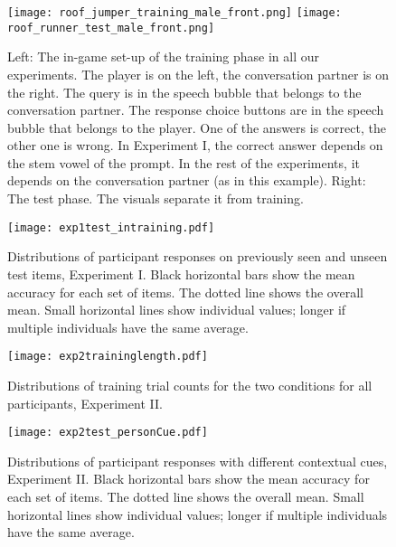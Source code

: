 \documentclass{frontiersSCNS} %
\begin{document}
\begin{figure}[ht]
\begin{center}
\texttt{[image: roof\_jumper\_training\_male\_front.png]}
\texttt{[image: roof\_runner\_test\_male\_front.png]}\\
\end{center}
\caption{ \large Left: The in-game set-up of the training phase in all our experiments. The player is on the left, the conversation partner is on the right. The query is in the speech bubble that belongs to the conversation partner. The response choice buttons are in the speech bubble that belongs to the player. One of the answers is correct, the other one is wrong. In Experiment I, the correct answer depends on the stem vowel of the prompt. In the rest of the experiments, it depends on the conversation partner (as in this example). Right: The test phase. The visuals separate it from training.}
\label{game}
\end{figure}

\begin{figure}[ht]
\begin{center}

\texttt{[image: exp1test\_intraining.pdf]}
\caption{ \large Distributions of participant responses on previously seen and unseen test items, Experiment I. Black horizontal bars 
show the mean accuracy for each set of items. The dotted line shows the overall mean. Small horizontal lines show individual values; longer if multiple individuals have the same average.}
\label{exp1test}
\end{center}
\end{figure}


\begin{figure}[ht]
\begin{center}
\texttt{[image: exp2traininglength.pdf]}
\caption{ \large  Distributions of training trial counts for the two conditions for all participants, Experiment II.}
\label{traininglength}
\end{center}
\end{figure}


\begin{figure}[ht]
\begin{center}
\texttt{[image: exp2test\_personCue.pdf]}
\caption{ \large Distributions of participant responses with different contextual cues, Experiment II. Black horizontal bars show the mean accuracy for each set of items. The dotted line shows the overall mean. Small horizontal lines show individual values; longer if multiple individuals have the same average.}
\label{exp2test}
\end{center}
\end{figure}
\end{document}
